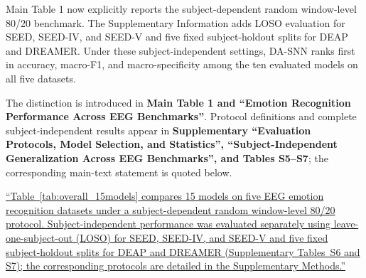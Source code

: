 \documentclass[12pt,technote,onecolumn]{IEEEtran}
\begin{document}
Main Table 1 now explicitly reports the subject-dependent random
window-level 80/20 benchmark. The Supplementary Information adds LOSO
evaluation for SEED, SEED-IV, and SEED-V and five fixed subject-holdout
splits for DEAP and DREAMER. Under these subject-independent settings,
DA-SNN ranks first in accuracy, macro-F1, and macro-specificity among
the ten evaluated models on all five datasets.



The distinction is introduced in \textbf{Main Table 1 and ``Emotion Recognition Performance Across EEG Benchmarks''}. Protocol definitions and complete subject-independent results appear in \textbf{Supplementary ``Evaluation Protocols, Model Selection, and Statistics'', ``Subject-Independent Generalization Across EEG Benchmarks'', and Tables S5--S7}; the corresponding main-text statement is quoted below.

\uline{``Table~\ref{tab:overall_15models} compares 15 models on five EEG emotion recognition datasets under a subject-dependent random window-level 80/20 protocol. Subject-independent performance was evaluated separately using leave-one-subject-out (LOSO) for SEED, SEED-IV, and SEED-V and five fixed subject-holdout splits for DEAP and DREAMER (Supplementary Tables~S6 and S7); the corresponding protocols are detailed in the Supplementary Methods.''}

\EvidenceMainTableOne
\end{document}
